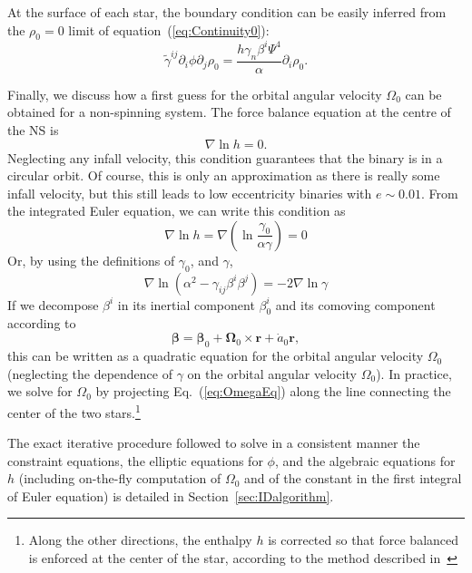\documentclass[aps,prd,amsmath,floatfix
,twocolumn
,superscriptaddress,nofootinbib,showpacs]{revtex4-1}
\theoremstyle{plain} \newtheorem{thm}{Theorem} \newtheorem{lem}{Lemma}
\begin{document}
At the surface of each star, the boundary condition can be easily
inferred from the $\rho_0=0$ limit of equation~(\ref{eq:Continuity0}):
\begin{equation}
\tilde{\gamma}^{ij}\partial_i\phi\partial_j\rho_0 =
\frac{h\gamma_n\beta^{i}\Psi^4}{\alpha}\partial_i\rho_0.
\end{equation}

Finally, we discuss how a first guess for the orbital angular velocity
$\Omega_0$ can be obtained for a non-spinning system.  The force
balance equation at the centre of the NS is
\begin{equation}
\nabla\ln{h}=0.
\end{equation}
Neglecting any infall velocity, this condition guarantees that the
binary is in a circular orbit. Of course, this is only an
approximation as there is really some infall velocity, but this still
leads to low eccentricity binaries with $e\sim 0.01$. From the
integrated Euler equation, we can write this condition as
\begin{equation}
\nabla\ln{h} = \nabla\left(\ln{\frac{\gamma_0}{\alpha\gamma}}\right)=0
\end{equation}
Or, by using the definitions of $\gamma_0$, and $\gamma$,
\begin{equation}
\nabla\ln\left(\alpha^2 - \gamma_{ij}\beta^{i}\beta^{j}\right) =
-2\nabla\ln{\gamma}
\label{eq:OmegaEq}
\end{equation}
If we decompose $\beta^i$ in its inertial component $\beta^i_0$ and
its comoving component according to
\begin{equation}
{\bm \beta} = {\bm \beta}_0 + {\bm \Omega}_0 \times {\bm r} + \dot a_0
{\bm r},
\end{equation}
this can be written as a quadratic equation for the orbital angular
velocity $\Omega_0$ (neglecting the dependence of $\gamma$ on the
orbital angular velocity $\Omega_0$).  In practice, we solve for
$\Omega_0$ by projecting Eq.~(\ref{eq:OmegaEq}) along the line
connecting the center of the two stars.\footnote{Along the other
  directions, the enthalpy $h$ is corrected so that force balanced is
  enforced at the center of the star, according to the method
  described in~\cite{Foucart:2010eq}}

The exact iterative procedure followed to solve in a consistent manner
the constraint equations, the elliptic equations for $\phi$, and the
algebraic equations for $h$ (including on-the-fly computation of
$\Omega_0$ and of the constant in the first integral of Euler
equation) is detailed in Section~\ref{sec:IDalgorithm}.
\end{document}
